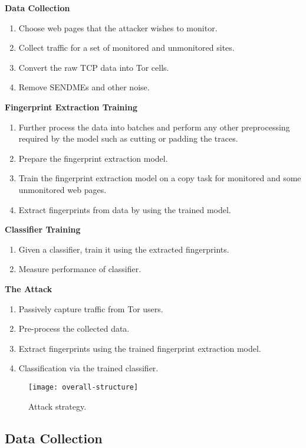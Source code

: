 \noindent
\textbf{Data Collection}
\begin{enumerate}
  \item Choose web pages that the attacker wishes to monitor.
  \item Collect traffic for a set of monitored and unmonitored sites.
  \item Convert the raw TCP data into Tor cells.
  \item Remove SENDMEs and other noise.
\end{enumerate}

\noindent
\textbf{Fingerprint Extraction Training}
\begin{enumerate}[resume]
  \item Further process the data into batches and perform any other preprocessing required by the model such as cutting or padding the traces.
  \item Prepare the fingerprint extraction model.
  \item Train the fingerprint extraction model on a copy task for monitored and some unmonitored web pages.
  \item Extract fingerprints from data by using the trained model.
\end{enumerate}

\noindent
\textbf{Classifier Training}
\begin{enumerate}[resume]
  \item Given a classifier, train it using the extracted fingerprints.
  \item Measure performance of classifier.
\end{enumerate}

\noindent
\textbf{The Attack}
\begin{enumerate}[resume]
  \item Passively capture traffic from Tor users.
  \item Pre-process the collected data.
  \item Extract fingerprints using the trained fingerprint extraction model.
  \item Classification via the trained classifier.
\end{enumerate}

\begin{figure}[ht]
  \centering
  \texttt{[image: overall-structure]}
  \caption{Attack strategy.}
  \label{fig:attack-strategy}
\end{figure}

\subsection{Data Collection} \label{sec:data_collection1}

